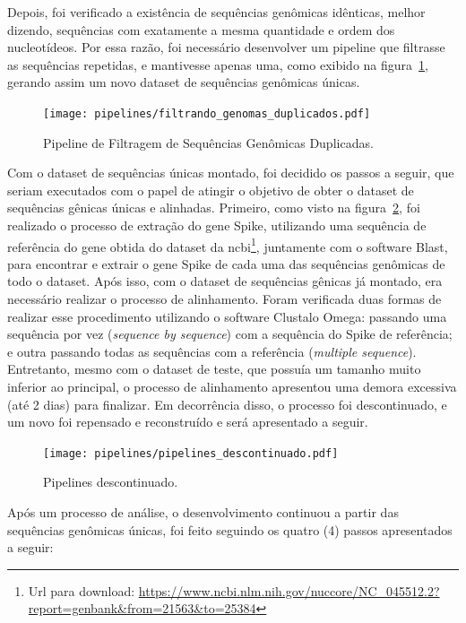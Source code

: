 Depois, foi verificado a existência de sequências genômicas idênticas, melhor dizendo, sequências com exatamente a mesma quantidade e ordem dos nucleotídeos. Por essa razão, foi necessário desenvolver um pipeline que filtrasse as sequências repetidas, e mantivesse apenas uma, como exibido na figura~\ref{fig:pipelineGenomicasDuplicadas}, gerando assim um novo dataset de sequências genômicas únicas.

\begin{figure}[htb]
  \centering
  \caption{Pipeline de Filtragem de Sequências Genômicas Duplicadas.}
  \texttt{[image: pipelines/filtrando\_genomas\_duplicados.pdf]}
  ~\label{fig:pipelineGenomicasDuplicadas}
\end{figure}

Com o dataset de sequências únicas montado, foi decidido os passos a seguir, que seriam executados com o papel de atingir o objetivo de obter o dataset de sequências gênicas únicas e alinhadas. Primeiro, como visto na figura~\ref{fig:pipelinesDescontinuados}, foi realizado o processo de extração do gene Spike, utilizando uma sequência de referência do gene obtida do dataset da \gls{ncbi}\footnote{Url para download: \url{https://www.ncbi.nlm.nih.gov/nuccore/NC_045512.2?report=genbank&from=21563&to=25384}}, juntamente com o software Blast, para encontrar e extrair o gene Spike de cada uma das sequências genômicas de todo o dataset. Após isso, com o dataset de sequências gênicas já montado, era necessário realizar o processo de alinhamento. Foram verificada duas formas de realizar esse procedimento utilizando o software Clustalo Omega: passando uma sequência por vez (\textit{sequence by sequence}) com a sequência do Spike de referência; e outra passando todas as sequências com a referência (\textit{multiple sequence}). Entretanto, mesmo com o dataset de teste, que possuía um tamanho muito inferior ao principal, o processo de alinhamento apresentou uma demora excessiva (até 2 dias) para finalizar. Em decorrência disso, o processo foi descontinuado, e um novo foi repensado e reconstruído e será apresentado a seguir.

\begin{figure}[htb]
  \centering
  \caption{Pipelines descontinuado.}
  \texttt{[image: pipelines/pipelines\_descontinuado.pdf]}
  ~\label{fig:pipelinesDescontinuados}
\end{figure}

Após um processo de análise, o desenvolvimento continuou a partir das sequências genômicas únicas, foi feito seguindo os quatro (4) passos apresentados a seguir:

